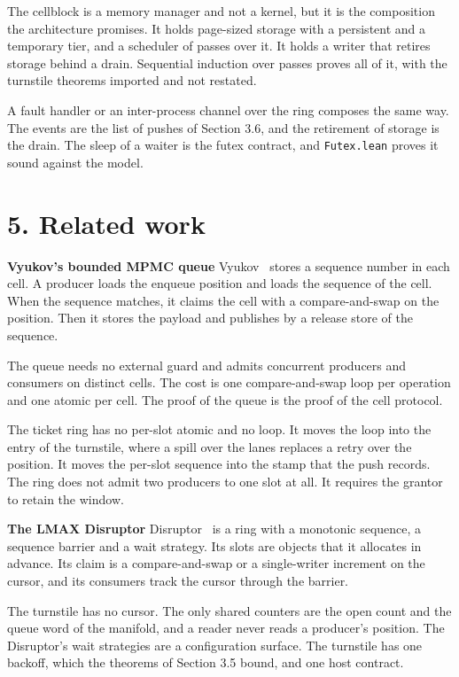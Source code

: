 The cellblock is a memory manager and not a kernel, but it is the composition the architecture promises. It holds page-sized storage with a persistent and a temporary tier, and a scheduler of passes over it. It holds a writer that retires storage behind a drain. Sequential induction over passes proves all of it, with the turnstile theorems imported and not restated.

A fault handler or an inter-process channel over the ring composes the same way. The events are the list of pushes of Section 3.6, and the retirement of storage is the drain. The sleep of a waiter is the futex contract, and \texttt{Futex.\allowbreak{}lean} proves it sound against the model.

\section{\texorpdfstring{5. Related work}{5. Related work}}

\textbf{Vyukov's bounded MPMC queue} Vyukov~\cite{src:Vyukov} stores a sequence number in each cell. A producer loads the enqueue position and loads the sequence of the cell. When the sequence matches, it claims the cell with a compare-and-swap on the position. Then it stores the payload and publishes by a release store of the sequence.

The queue needs no external guard and admits concurrent producers and consumers on distinct cells. The cost is one compare-and-swap loop per operation and one atomic per cell. The proof of the queue is the proof of the cell protocol.

The ticket ring has no per-slot atomic and no loop. It moves the loop into the entry of the turnstile, where a spill over the lanes replaces a retry over the position. It moves the per-slot sequence into the stamp that the push records. The ring does not admit two producers to one slot at all. It requires the grantor to retain the window.

\textbf{The LMAX Disruptor} Disruptor~\cite{src:Disruptor} is a ring with a monotonic sequence, a sequence barrier and a wait strategy. Its slots are objects that it allocates in advance. Its claim is a compare-and-swap or a single-writer increment on the cursor, and its consumers track the cursor through the barrier.

The turnstile has no cursor. The only shared counters are the open count and the queue word of the manifold, and a reader never reads a producer's position. The Disruptor's wait strategies are a configuration surface. The turnstile has one backoff, which the theorems of Section 3.5 bound, and one host contract.

